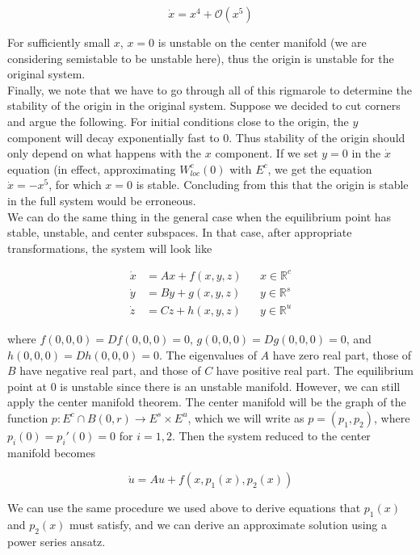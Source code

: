 \documentclass{article}
\def\R{{\mathbb R}}
\begin{document}
\[
\dot{x} = x^4 + \mathcal{O}(x^5)
\]

For sufficiently small $x$, $x = 0$ is unstable on the center manifold (we are considering semistable to be unstable here), thus the origin is unstable for the original system.\\

Finally, we note that we have to go through all of this rigmarole to determine the stability of the origin in the original system. Suppose we decided to cut corners and argue the following. For initial conditions close to the origin, the $y$ component will decay exponentially fast to 0. Thus stability of the origin should only depend on what happens with the $x$ component. If we set $y = 0$ in the $\dot{x}$ equation (in effect, approximating $W^c_{loc}(0)$ with $E^c$, we get the equation $\dot{x} = -x^5$, for which $x = 0$ is stable. Concluding from this that the origin is stable in the full system would be erroneous.\\

We can do the same thing in the general case when the equilibrium point has stable, unstable, and center subspaces. In that case, after appropriate transformations, the system will look like

\begin{align}
\dot{x} &= Ax + f(x, y, z) && x \in \R^c \\
\dot{y} &= By + g(x, y, z) && y \in \R^s \\
\dot{z} &= Cz + h(x, y, z) && y \in \R^u 
\end{align}

where $f(0,0,0) = Df(0,0,0) = 0$, $g(0,0,0) = Dg(0,0,0) = 0$, and $h(0,0,0) = Dh(0,0,0) = 0$. The eigenvalues of $A$ have zero real part, those of $B$ have negative real part, and those of $C$ have positive real part. The equilibrium point at 0 is unstable since there is an unstable manifold. However, we can still apply the center manifold theorem. The center manifold will be the graph of the function $p: E^c \cap B(0, r) \rightarrow E^s \times E^u$, which we will write as $p = (p_1, p_2)$, where $p_i(0) = p_i'(0) = 0$ for $i = 1, 2$. Then the system reduced to the center manifold becomes

\[
\dot{u} = Au + f(x, p_1(x), p_2(x))
\]

We can use the same procedure we used above to derive equations that $p_1(x)$ and $p_2(x)$ must satisfy, and we can derive an approximate solution using a power series ansatz.\\
\end{document}
